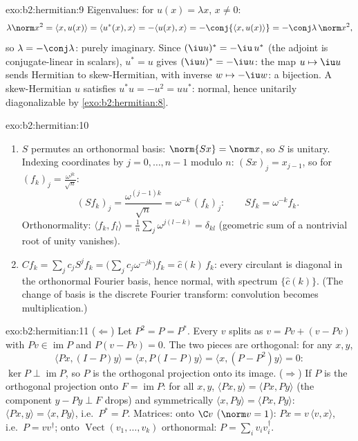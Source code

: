 \begin{solution}{exo:b2:hermitian:9}
Eigenvalues: for $u(x) = \lambda x$, $x \neq 0$:
\[
\lambda\norm x^2 = \langle x, u(x)\rangle
= \langle u^*(x), x\rangle = -\langle u(x), x\rangle
= -\conj{\langle x, u(x)\rangle} = -\conj\lambda\,\norm x^2 ,
\]
so $\lambda = -\conj\lambda$: purely imaginary. Since $(\iu
u)^* = -\iu\,u^*$ (the adjoint is conjugate-linear in scalars),
$u^* = u$ gives $(\iu u)^* = -\iu u$: the map $u \mapsto \iu u$
sends Hermitian to skew-Hermitian, with inverse $w \mapsto -\iu
w$: a bijection. A skew-Hermitian $u$ satisfies $u^*u = -u^2 =
uu^*$: normal, hence unitarily diagonalizable by
\cref{exo:b2:hermitian:8}.
\end{solution}

\begin{solution}{exo:b2:hermitian:10}
\begin{enumerate}
  \item $S$ permutes an orthonormal basis: $\norm{Sx} = \norm
        x$, so $S$ is unitary. Indexing coordinates by $j = 0,
        \dots, n-1$ modulo $n$: $(Sx)_j = x_{j-1}$, so for
        $(f_k)_j = \frac{\omega^{jk}}{\sqrt n}$:
        \[
        (Sf_k)_j = \frac{\omega^{(j-1)k}}{\sqrt n}
        = \omega^{-k}\,(f_k)_j :
        \qquad Sf_k = \omega^{-k}f_k .
        \]
        Orthonormality: $\langle f_k, f_l\rangle = \frac1n
        \sum_j \omega^{j(l-k)} = \delta_{kl}$ (geometric sum
        of a nontrivial root of unity vanishes).
  \item $Cf_k = \sum_j c_j S^jf_k = \bigl(\sum_j
        c_j\omega^{-jk}\bigr)f_k = \widehat c(k)\,f_k$: every
        circulant is diagonal in the orthonormal Fourier basis,
        hence normal, with spectrum $\{\widehat c(k)\}$. (The
        change of basis is the discrete Fourier transform:
        convolution becomes multiplication.)
\end{enumerate}
\end{solution}

\begin{solution}{exo:b2:hermitian:11}
($\Leftarrow$) Let $P^2 = P = P^*$. Every $v$ splits as $v = Pv
+ (v - Pv)$ with $Pv \in \operatorname{im} P$ and $P(v - Pv) =
0$. The two pieces are orthogonal: for any $x, y$,
\[
\langle Px, (I - P)y\rangle = \langle x, P(I-P)y\rangle
= \langle x, (P - P^2)y\rangle = 0 :
\]
$\ker P \perp \operatorname{im} P$, so $P$ is the orthogonal
projection onto its image. ($\Rightarrow$) If $P$ is the
orthogonal projection onto $F = \operatorname{im}P$: for all
$x, y$, $\langle Px, y\rangle = \langle Px, Py\rangle$ (the
component $y - Py \perp F$ drops) and symmetrically $\langle
x, Py\rangle = \langle Px, Py\rangle$: $\langle Px, y\rangle =
\langle x, Py\rangle$, i.e.\ $P^* = P$. Matrices: onto $\C v$
($\norm v = 1$): $Px = v\,\langle v, x\rangle$, i.e.\ $P =
vv^\dagger$; onto $\operatorname{Vect}(v_1, \dots, v_k)$
orthonormal: $P = \sum_i v_iv_i^\dagger$.
\end{solution}


